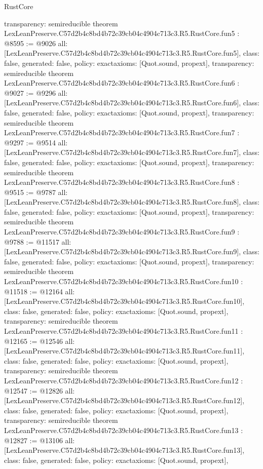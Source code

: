\begin{lexlean}{RustCore}
\begin{coremodule}
{  transparency: semireducible
}
theorem LexLeanPreserve.C57d2b4c8bd4b72c39cb04c4904c713c3.R5.RustCore.fun5 : @8595 := @9026 {
  all: [LexLeanPreserve.C57d2b4c8bd4b72c39cb04c4904c713c3.R5.RustCore.fun5],
  class: false,
  generated: false,
  policy: exact{axioms: [Quot.sound, propext]},
  transparency: semireducible
}
theorem LexLeanPreserve.C57d2b4c8bd4b72c39cb04c4904c713c3.R5.RustCore.fun6 : @9027 := @9296 {
  all: [LexLeanPreserve.C57d2b4c8bd4b72c39cb04c4904c713c3.R5.RustCore.fun6],
  class: false,
  generated: false,
  policy: exact{axioms: [Quot.sound, propext]},
  transparency: semireducible
}
theorem LexLeanPreserve.C57d2b4c8bd4b72c39cb04c4904c713c3.R5.RustCore.fun7 : @9297 := @9514 {
  all: [LexLeanPreserve.C57d2b4c8bd4b72c39cb04c4904c713c3.R5.RustCore.fun7],
  class: false,
  generated: false,
  policy: exact{axioms: [Quot.sound, propext]},
  transparency: semireducible
}
theorem LexLeanPreserve.C57d2b4c8bd4b72c39cb04c4904c713c3.R5.RustCore.fun8 : @9515 := @9787 {
  all: [LexLeanPreserve.C57d2b4c8bd4b72c39cb04c4904c713c3.R5.RustCore.fun8],
  class: false,
  generated: false,
  policy: exact{axioms: [Quot.sound, propext]},
  transparency: semireducible
}
theorem LexLeanPreserve.C57d2b4c8bd4b72c39cb04c4904c713c3.R5.RustCore.fun9 : @9788 := @11517 {
  all: [LexLeanPreserve.C57d2b4c8bd4b72c39cb04c4904c713c3.R5.RustCore.fun9],
  class: false,
  generated: false,
  policy: exact{axioms: [Quot.sound, propext]},
  transparency: semireducible
}
theorem LexLeanPreserve.C57d2b4c8bd4b72c39cb04c4904c713c3.R5.RustCore.fun10 : @11518 := @12164 {
  all: [LexLeanPreserve.C57d2b4c8bd4b72c39cb04c4904c713c3.R5.RustCore.fun10],
  class: false,
  generated: false,
  policy: exact{axioms: [Quot.sound, propext]},
  transparency: semireducible
}
theorem LexLeanPreserve.C57d2b4c8bd4b72c39cb04c4904c713c3.R5.RustCore.fun11 : @12165 := @12546 {
  all: [LexLeanPreserve.C57d2b4c8bd4b72c39cb04c4904c713c3.R5.RustCore.fun11],
  class: false,
  generated: false,
  policy: exact{axioms: [Quot.sound, propext]},
  transparency: semireducible
}
theorem LexLeanPreserve.C57d2b4c8bd4b72c39cb04c4904c713c3.R5.RustCore.fun12 : @12547 := @12826 {
  all: [LexLeanPreserve.C57d2b4c8bd4b72c39cb04c4904c713c3.R5.RustCore.fun12],
  class: false,
  generated: false,
  policy: exact{axioms: [Quot.sound, propext]},
  transparency: semireducible
}
theorem LexLeanPreserve.C57d2b4c8bd4b72c39cb04c4904c713c3.R5.RustCore.fun13 : @12827 := @13106 {
  all: [LexLeanPreserve.C57d2b4c8bd4b72c39cb04c4904c713c3.R5.RustCore.fun13],
  class: false,
  generated: false,
  policy: exact{axioms: [Quot.sound, propext]},
}
\end{coremodule}
\end{lexlean}
